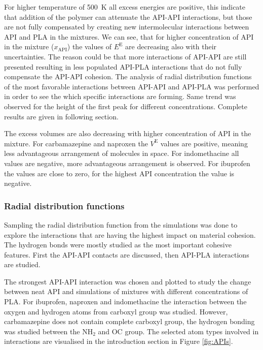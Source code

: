 For higher temperature of 500~K all excess energies are positive, this indicate that addition of the polymer can attenuate the API-API interactions, but those are not fully compensated by creating new intermolecular interactions between API and PLA in the mixtures. We can see, that for higher concentration of API in the mixture ($x_{\text{API}}$) the values of $E^\text{E}$ are decreasing also with their uncertainties. The reason could be that more interactions of API-API are still presented resulting in less populated API-PLA interactions that do not fully compensate the API-API cohesion. The analysis of radial distribution functions of the most favorable interactions between API-API and API-PLA was performed in order to see the which specific interactions are forming. Same trend was observed for the height of the first peak for different concentrations. Complete results are given in following section.

The excess volumes are also decreasing with higher concentration of API in the mixture. For carbamazepine and naproxen the $V^\text{E}$ values are positive, meaning less advantageous arrangement of molecules in space. For indomethacine all values are negative, more advantageous arrangement is observed. For ibuprofen the values are close to zero, for the highest API concentration the value is negative.

\subsubsection{Radial distribution functions}

Sampling the radial distribution function from the simulations was done to explore the interactions that are having the highest impact on material cohesion. The hydrogen bonds were mostly studied as the most important cohesive features. First the API-API contacts are discussed, then API-PLA interactions are studied.

The strongest API-API interaction was chosen and plotted to study the change between neat API and simulations of mixtures with different concentrations of PLA. For ibuprofen, naproxen and indomethacine the interaction between the oxygen and hydrogen atoms from carboxyl group was studied. However, carbamazepine does not contain complete carboxyl group, the hydrogen bonding was studied between the N$\text{H}_\text{2}$ and OC group. The selected atom types involved in interactions are visualised in the introduction section in Figure \ref{fig:APIs}. 

